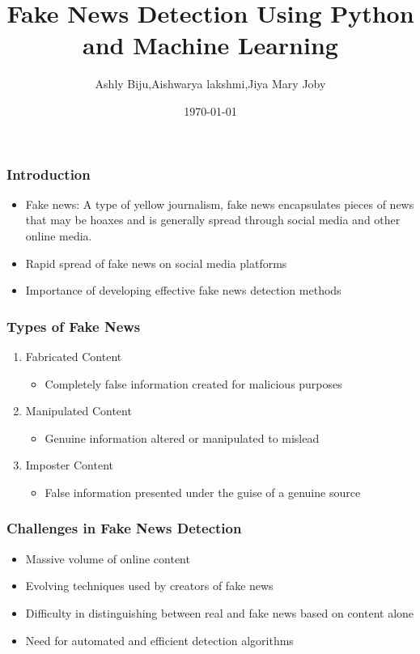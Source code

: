 \documentclass{beamer}
\title{Fake News Detection Using Python and Machine Learning}
\author{Ashly Biju,Aishwarya lakshmi,Jiya Mary Joby}
\institute{Saintgits Group of Institutions}
\date{\today}
\begin{document}
\begin{frame}
  \titlepage
\end{frame}

\begin{frame}
  \frametitle{Introduction} 
  \begin{itemize}
    \item Fake news: A type of yellow journalism, fake news encapsulates pieces of news that may be hoaxes and is generally spread through social media and other online media.  
    \item Rapid spread of fake news on social media platforms
    \item Importance of developing effective fake news detection methods
  \end{itemize}
\end{frame}

\begin{frame}
  \frametitle{Types of Fake News}
  \begin{enumerate}
    \item Fabricated Content
    \begin{itemize}
      \item Completely false information created for malicious purposes
    \end{itemize}
    \item Manipulated Content
    \begin{itemize}
      \item Genuine information altered or manipulated to mislead
    \end{itemize}
    \item Imposter Content
    \begin{itemize}
      \item False information presented under the guise of a genuine source
    \end{itemize}
  \end{enumerate}
\end{frame}

\begin{frame}
  \frametitle{Challenges in Fake News Detection}
  \begin{itemize}
    \item Massive volume of online content
    \item Evolving techniques used by creators of fake news
    \item Difficulty in distinguishing between real and fake news based on content alone
    \item Need for automated and efficient detection algorithms
  \end{itemize}
\end{frame}
\end{document}
